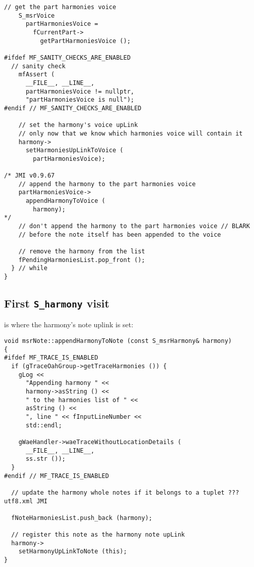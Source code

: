 \begin{lstlisting}[language=CPlusPlus]
    // get the part harmonies voice
    S_msrVoice
      partHarmoniesVoice =
        fCurrentPart->
          getPartHarmoniesVoice ();

#ifdef MF_SANITY_CHECKS_ARE_ENABLED
  // sanity check
    mfAssert (
      __FILE__, __LINE__,
      partHarmoniesVoice != nullptr,
      "partHarmoniesVoice is null");
#endif // MF_SANITY_CHECKS_ARE_ENABLED

    // set the harmony's voice upLink
    // only now that we know which harmonies voice will contain it
    harmony->
      setHarmoniesUpLinkToVoice (
        partHarmoniesVoice);

/* JMI v0.9.67
    // append the harmony to the part harmonies voice
    partHarmoniesVoice->
      appendHarmonyToVoice (
        harmony);
*/
    // don't append the harmony to the part harmonies voice // BLARK
    // before the note itself has been appended to the voice

    // remove the harmony from the list
    fPendingHarmoniesList.pop_front ();
  } // while
}
\end{lstlisting}


\subsection{First {\tt S_harmony} visit}

 is where the harmony's note uplink is set:
\begin{lstlisting}[language=CPlusPlus]
void msrNote::appendHarmonyToNote (const S_msrHarmony& harmony)
{
#ifdef MF_TRACE_IS_ENABLED
  if (gTraceOahGroup->getTraceHarmonies ()) {
    gLog <<
      "Appending harmony " <<
      harmony->asString () <<
      " to the harmonies list of " <<
      asString () <<
      ", line " << fInputLineNumber <<
      std::endl;

    gWaeHandler->waeTraceWithoutLocationDetails (
      __FILE__, __LINE__,
      ss.str ());
  }
#endif // MF_TRACE_IS_ENABLED

  // update the harmony whole notes if it belongs to a tuplet ??? utf8.xml JMI

  fNoteHarmoniesList.push_back (harmony);

  // register this note as the harmony note upLink
  harmony->
    setHarmonyUpLinkToNote (this);
}
\end{lstlisting}

